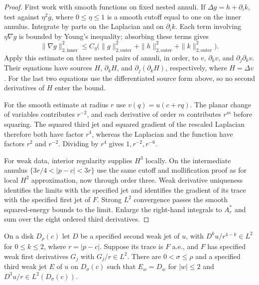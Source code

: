 \begin{proof}
\leanok
First work with smooth functions on fixed nested annuli. If
$\Delta g=h+\partial_i k$, test against $\eta^2\overline g$, where
$0\le\eta\le1$ is a smooth cutoff equal to one on the inner annulus.
Integrate by parts on the Laplacian and on $\partial_i k$.
Each term involving $\eta\nabla g$ is bounded by Young's inequality;
absorbing these terms gives
\[
 \|\nabla g\|_{2,\mathrm{inner}}^2
 \le C_\eta\bigl(\|g\|_{2,\mathrm{outer}}^2+
       \|h\|_{2,\mathrm{outer}}^2+\|k\|_{2,\mathrm{outer}}^2\bigr).
\]
Apply this estimate on three nested pairs of annuli, in order, to $v$,
$\partial_k v$, and $\partial_j\partial_k v$. Their equations have sources
$H$, $\partial_k H$, and $\partial_j(\partial_k H)$, respectively,
where $H=\Delta v$. For the last two equations use the differentiated
source form above, so no second derivatives of $H$ enter the bound.

For the smooth estimate at radius $r$ use $v(q)=u(c+rq)$.
The planar change of variables contributes $r^{-2}$, and each
derivative of order $m$ contributes $r^m$ before squaring.
The squared third jet and squared gradient of the rescaled Laplacian
therefore both have factor $r^4$, whereas the Laplacian and the function
have factors $r^2$ and $r^{-2}$. Dividing by $r^4$ gives $1,r^{-2},r^{-6}$.

For weak data, interior regularity supplies $H^3$ locally. On the
intermediate annulus $\{3r/4<|p-c|<3r\}$ use the same cutoff and
mollification proof as for local $H^2$ approximation, now through order
three. Weak derivative uniqueness identifies the limits with the specified
jet and identifies the gradient of its trace with the specified first
jet of $F$. Strong $L^2$ convergence passes the smooth squared-energy
bounds to the limit. Enlarge the right-hand integrals to $A_r^*$ and
sum over the eight ordered third derivatives.
\end{proof}

\begin{lemma}
\label{lem:elliptic-weighted-third}
\leanok
On a disk $D_\rho(c)$ let $D$ be a specified second weak jet of $u$, with
$D^ku/r^{4-k}\in L^2$ for $0\le k\le2$, where $r=|p-c|$.
Suppose its trace is $F$ a.e., and $F$ has specified weak first
derivatives $G_j$ with $G_j/r\in L^2$.
There are $0<\sigma\le\rho$ and a specified third weak jet $E$ of $u$
on $D_\sigma(c)$ such that $E_w=D_w$ for $|w|\le2$ and
$D^3u/r\in L^2(D_\sigma(c))$.
\end{lemma}

